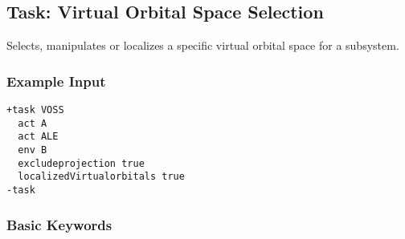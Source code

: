 \subsection{Task: Virtual Orbital Space Selection}
\label{sec:VOSS}
Selects, manipulates or localizes a specific virtual orbital space for a subsystem.
\subsubsection{Example Input}
\begin{lstlisting}
+task VOSS
  act A
  act ALE
  env B
  excludeprojection true
  localizedVirtualorbitals true
-task
\end{lstlisting}
\subsubsection{Basic Keywords}

